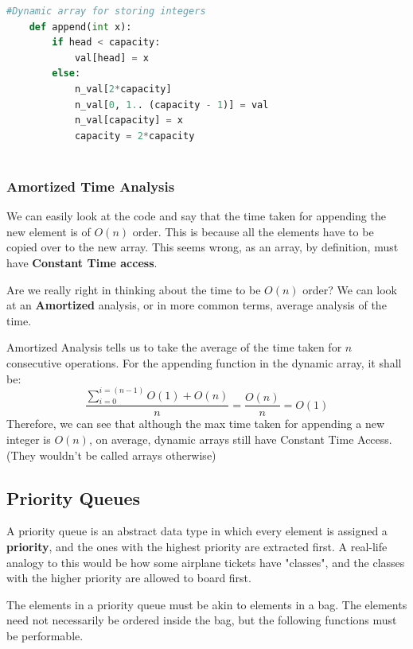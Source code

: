 \documentclass{article}
\theoremstyle{definition}
\theoremstyle{example}
\begin{document}
\begin{lstlisting}[language = python, basicstyle = \Large]
#Dynamic array for storing integers
    def append(int x):
        if head < capacity:
            val[head] = x
        else:
            n_val[2*capacity]
            n_val[0, 1.. (capacity - 1)] = val
            n_val[capacity] = x
            capacity = 2*capacity
            
\end{lstlisting}

\subsubsection{\Large Amortized Time Analysis}
\hspace{4mm} We can easily look at the code and say that the time taken for appending the new element is of $O(n)$ order. This is because all the elements have to be copied over to the new array. This seems wrong, as an array, by definition, must have \textbf{Constant Time access}.\par
\vspace{4mm}
Are we really right in thinking about the time to be $O(n)$ order? We can look at an \textbf{Amortized} analysis, or in more common terms, average analysis of the time.\par
\vspace{4mm}
\noindent Amortized Analysis tells us to take the average of the time taken for $n$ consecutive operations. For the appending function in the dynamic array, it shall be: $$\frac{\sum_{i=0}^{i=(n-1)}O(1) + O(n)}{n} = \frac{O(n)}{n} = O(1)$$
Therefore, we can see that although the max time taken for appending a new integer is $O(n)$, on average, dynamic arrays still have Constant Time Access.(They wouldn't be called arrays otherwise)
\newpage

\subsection{\Large Priority Queues}
\hspace{4mm} A priority queue is an abstract data type in which every element is assigned a \textbf{priority}, and the ones with the highest priority are extracted first. A real-life analogy to this would be how some airplane tickets have "classes", and the classes with the higher priority are allowed to board first. \par
\vspace{4mm}
The elements in a priority queue must be akin to elements in a bag. The elements need not necessarily be ordered inside the bag, but the following functions must be performable.\par
\end{document}
